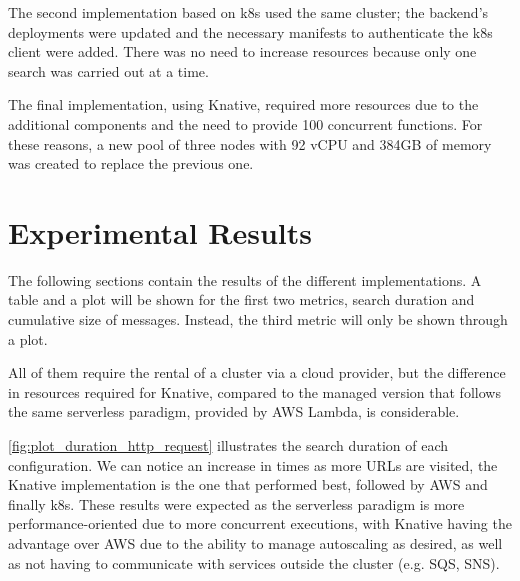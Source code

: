 \documentclass[../thesis.tex]{subfiles}
\begin{document}
The second implementation based on \gls{k8s} used the same cluster; the backend's \gls{deployment}s were updated and the necessary manifests to authenticate the \gls{k8s} client were added. There was no need to increase resources because only one search was carried out at a time.

The final implementation, using Knative, required more resources due to the additional components and the need to provide 100 concurrent functions. For these reasons, a new pool of three nodes with 92 vCPU and 384GB of memory was created to replace the previous one.

\section{Experimental Results}
The following sections contain the results of the different implementations. A table and a plot will be shown for the first two metrics, search duration and cumulative size of messages.  Instead, the third metric will only be shown through a plot.

All of them require the rental of a cluster via a cloud provider, but the difference in resources required for Knative, compared to the managed version that follows the same serverless paradigm, provided by \acrshort{AWS} Lambda, is considerable.

\newpage

\autoref{fig:plot_duration_http_request} illustrates the search duration of each configuration. We can notice an increase in times as more \acrshort{URL}s are visited, the Knative implementation is the one that performed best, followed by \acrshort{AWS} and finally \gls{k8s}. These results were expected as the serverless paradigm is more performance-oriented due to more concurrent executions, with Knative having the advantage over \acrshort{AWS} due to the ability to manage autoscaling as desired, as well as not having to communicate with services outside the cluster (e.g. \acrshort{SQS}, \acrshort{SNS}).

\vspace*{4cm}
\end{document}
